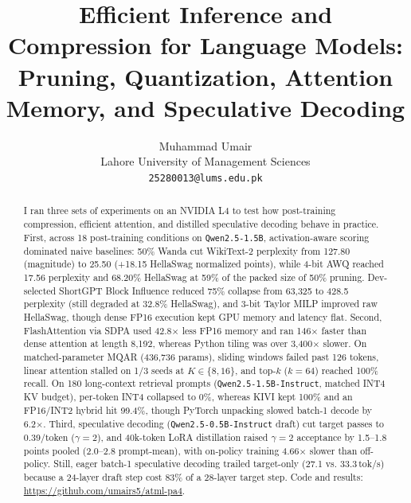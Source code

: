 \documentclass{article}
\title{Efficient Inference and Compression for Language Models:\\
Pruning, Quantization, Attention Memory, and Speculative Decoding}
\author{%
  Muhammad Umair \\
  Lahore University of Management Sciences \\
  \texttt{25280013@lums.edu.pk}
}
\begin{document}
\maketitle

\begin{abstract}
I ran three sets of experiments on an NVIDIA L4 to test how post-training compression, efficient attention, and distilled speculative decoding behave in practice. First, across 18 post-training conditions on \texttt{Qwen2.5-1.5B}, activation-aware scoring dominated naive baselines: 50\% Wanda cut WikiText-2 perplexity from 127.80 (magnitude) to 25.50 (+18.15 HellaSwag normalized points), while 4-bit AWQ reached 17.56 perplexity and 68.20\% HellaSwag at 59\% of the packed size of 50\% pruning. Dev-selected ShortGPT Block Influence reduced 75\% collapse from 63,325 to 428.5 perplexity (still degraded at 32.8\% HellaSwag), and 3-bit Taylor MILP improved raw HellaSwag, though dense FP16 execution kept GPU memory and latency flat. Second, FlashAttention via SDPA used 42.8$\times$ less FP16 memory and ran 146$\times$ faster than dense attention at length 8,192, whereas Python tiling was over 3,400$\times$ slower. On matched-parameter MQAR (436,736 params), sliding windows failed past 126 tokens, linear attention stalled on 1/3 seeds at $K\in\{8,16\}$, and top-$k$ ($k=64$) reached 100\% recall. On 180 long-context retrieval prompts (\texttt{Qwen2.5-1.5B-Instruct}, matched INT4 KV budget), per-token INT4 collapsed to 0\%, whereas KIVI kept 100\% and an FP16/INT2 hybrid hit 99.4\%, though PyTorch unpacking slowed batch-1 decode by 6.2$\times$. Third, speculative decoding (\texttt{Qwen2.5-0.5B-Instruct} draft) cut target passes to 0.39/token ($\gamma=2$), and 40k-token LoRA distillation raised $\gamma=2$ acceptance by 1.5--1.8 points pooled (2.0--2.8 prompt-mean), with on-policy training 4.66$\times$ slower than off-policy. Still, eager batch-1 speculative decoding trailed target-only (27.1 vs. 33.3\,tok/s) because a 24-layer draft step cost 83\% of a 28-layer target step. Code and results: \url{https://github.com/umairs5/atml-pa4}.
\end{abstract}
\end{document}
